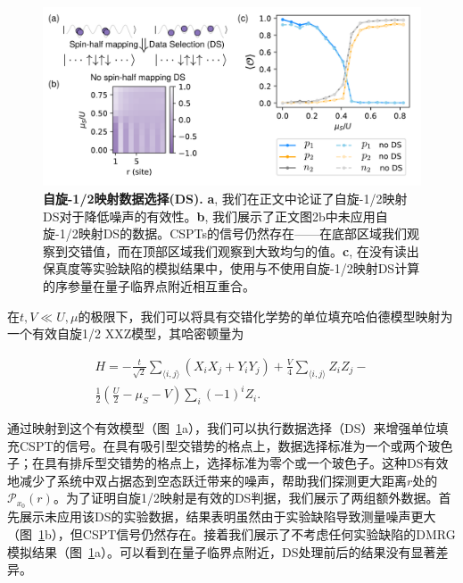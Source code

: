 \documentclass[preprint,superscriptaddress,floatfix,nofootinbib]{revtex4-2}
\begin{document}
\begin{figure}
    \centering
    \includegraphics[width=\textwidth]{figures/DS.pdf}
    \caption{\textbf{自旋-1/2映射数据选择(DS).} \textbf{a}, 我们在正文中论证了自旋-1/2映射DS对于降低噪声的有效性。\textbf{b}, 我们展示了正文图2b中未应用自旋-1/2映射DS的数据。CSPTs的信号仍然存在——在底部区域我们观察到交错值，而在顶部区域我们观察到大致均匀的值。\textbf{c}, 在没有读出保真度等实验缺陷的模拟结果中，使用与不使用自旋-1/2映射DS计算的序参量在量子临界点附近相互重合。
    }
    \label{fig: spin_half_DS_extended_data}
\end{figure}

在$t, V\ll U, \mu$的极限下，我们可以将具有交错化学势的单位填充哈伯德模型映射为一个有效自旋1/2 XXZ模型，其哈密顿量为

\begin{equation}
\label{eq: XXZ_Hamiltonian}
\begin{split}
H=-\frac{t}{\sqrt{2}}\sum_{\langle i,j \rangle}(X_iX_j+Y_iY_j)+\frac{V}{4}\sum_{\langle i,j \rangle}Z_iZ_j-\\\frac{1}{2}(\frac{U}{2}-\mu_S-V)\sum_i(-1)^iZ_i.
\end{split}
\end{equation}

通过映射到这个有效模型（图~\ref{fig: spin_half_DS_extended_data}a），我们可以执行数据选择（DS）来增强单位填充CSPT的信号。在具有吸引型交错势的格点上，数据选择标准为一个或两个玻色子；在具有排斥型交错势的格点上，选择标准为零个或一个玻色子。这种DS有效地减少了系统中双占据态到空态跃迁带来的噪声，帮助我们探测更大距离$r$处的$\mathcal{P}_{x_0}(r)$。为了证明自旋1/2映射是有效的DS判据，我们展示了两组额外数据。首先展示未应用该DS的实验数据，结果表明虽然由于实验缺陷导致测量噪声更大（图~\ref{fig: spin_half_DS_extended_data}b），但CSPT信号仍然存在。接着我们展示了不考虑任何实验缺陷的DMRG模拟结果（图~\ref{fig: spin_half_DS_extended_data}a）。可以看到在量子临界点附近，DS处理前后的结果没有显著差异。
\end{document}

